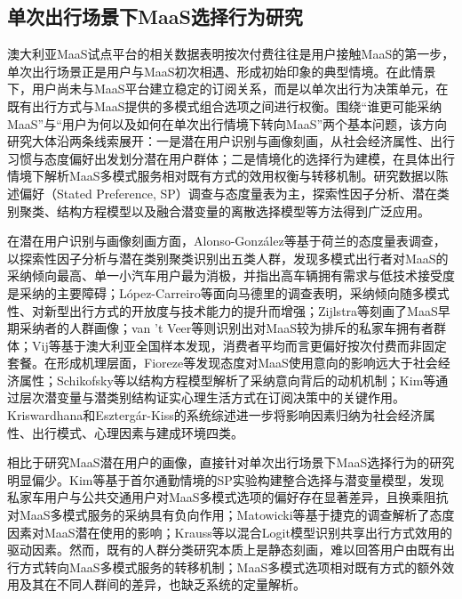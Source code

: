 \subsection{单次出行场景下MaaS选择行为研究}\label{subsec.review.maas.trip}

澳大利亚MaaS试点平台的相关数据表明按次付费往往是用户接触MaaS的第一步\citep{hoDriversParticipantsChoices2021}，单次出行场景正是用户与MaaS初次相遇、形成初始印象的典型情境。在此情景下，用户尚未与MaaS平台建立稳定的订阅关系，而是以单次出行为决策单元，在既有出行方式与MaaS提供的多模式组合选项之间进行权衡。围绕``谁更可能采纳MaaS''与``用户为何以及如何在单次出行情境下转向MaaS''两个基本问题，该方向研究大体沿两条线索展开：一是潜在用户识别与画像刻画，从社会经济属性、出行习惯与态度偏好出发划分潜在用户群体；二是情境化的选择行为建模，在具体出行情境下解析MaaS多模式服务相对既有方式的效用权衡与转移机制。研究数据以陈述偏好（Stated Preference, SP）调查与态度量表为主，探索性因子分析、潜在类别聚类、结构方程模型以及融合潜变量的离散选择模型等方法得到广泛应用\citep{kriswardhanaExploringAspectsMaaS2023}。

在潜在用户识别与画像刻画方面，Alonso-Gonz\'alez等\citep{alonso-gonzalezDriversBarriersAdopting2020}基于荷兰的态度量表调查，以探索性因子分析与潜在类别聚类识别出五类人群，发现多模式出行者对MaaS的采纳倾向最高、单一小汽车用户最为消极，并指出高车辆拥有需求与低技术接受度是采纳的主要障碍；L\'opez-Carreiro等\citep{lopez-carreiroAreTravellersWilling2021}面向马德里的调查表明，采纳倾向随多模式性、对新型出行方式的开放度与技术能力的提升而增强；Zijlstra等\citep{zijlstraEarlyAdoptersMobilityasaService2020}刻画了MaaS早期采纳者的人群画像；van 't Veer等\citep{vantveerMobilityasaServiceMaaSLatent2023}则识别出对MaaS较为排斥的私家车拥有者群体；Vij等\citep{vijConsumerPreferencesMobilityasaService2020}基于澳大利亚全国样本发现，消费者平均而言更偏好按次付费而非固定套餐。在形成机理层面，Fioreze等\citep{fiorezeLikelihoodUsingMobilityasaService2019}发现态度对MaaS使用意向的影响远大于社会经济属性；Schikofsky等\citep{schikofskyExploringMotivationalMechanisms2020}以结构方程模型解析了采纳意向背后的动机机制；Kim等\citep{kimInfluenceLatentLifestyle2022}通过层次潜变量与潜类别结构证实心理生活方式在订阅决策中的关键作用。Kriswardhana和Eszterg\'ar-Kiss\citep{kriswardhanaExploringAspectsMaaS2023}的系统综述进一步将影响因素归纳为社会经济属性、出行模式、心理因素与建成环境四类。

相比于研究MaaS潜在用户的画像，直接针对单次出行场景下MaaS选择行为的研究明显偏少。Kim等\citep{kimComparativeAnalysisUsers2021}基于首尔通勤情境的SP实验构建整合选择与潜变量模型，发现私家车用户与公共交通用户对MaaS多模式选项的偏好存在显著差异，且换乘阻抗对MaaS多模式服务的采纳具有负向作用；Matowicki等\citep{matowickiUnderstandingPotentialMaaS2022}基于捷克的调查解析了态度因素对MaaS潜在使用的影响；Krauss等\citep{kraussWhatDrivesUtility2022}以混合Logit模型识别共享出行方式效用的驱动因素。然而，既有的人群分类研究本质上是静态刻画，难以回答用户由既有出行方式转向MaaS多模式服务的转移机制；MaaS多模式选项相对既有方式的额外效用及其在不同人群间的差异，也缺乏系统的定量解析。

